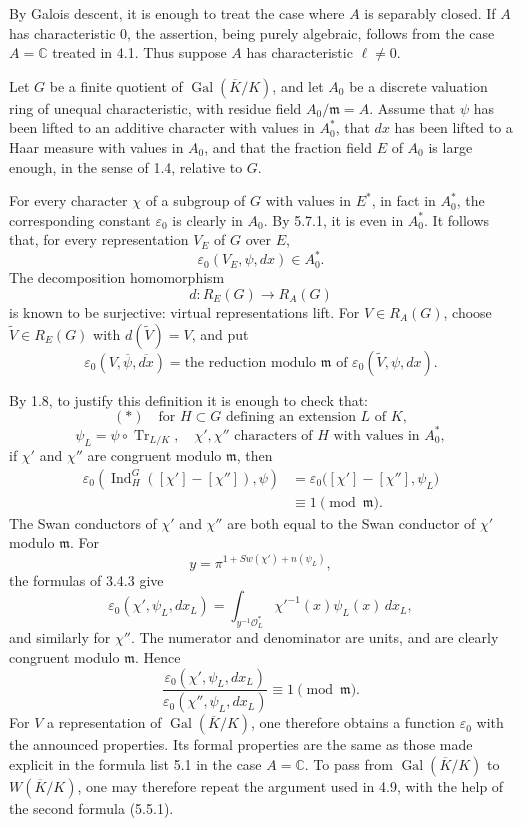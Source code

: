 \documentclass[10pt]{article}
\newcommand{\C}{\mathbb C}
\newcommand{\Gal}{\operatorname{Gal}}
\newcommand{\Ind}{\operatorname{Ind}}
\newcommand{\Tr}{\operatorname{Tr}}
\providecommand{\Gal}{\operatorname{Gal}}
\providecommand{\Gal}{\operatorname{Gal}}
\providecommand{\Tr}{\operatorname{Tr}}
\providecommand{\Gal}{\operatorname{Gal}}
\providecommand{\Tr}{\operatorname{Tr}}
\providecommand{\Gal}{\operatorname{Gal}}
\providecommand{\Tr}{\operatorname{Tr}}
\providecommand{\Ind}{\operatorname{Ind}}
\begin{document}
By Galois descent, it is enough to treat the case where \(A\) is separably closed. If \(A\) has characteristic \(0\), the assertion, being purely algebraic, follows from the case \(A=\C\) treated in 4.1. Thus suppose \(A\) has characteristic \(\ell\ne0\).

Let \(G\) be a finite quotient of \(\Gal(\overline K/K)\), and let \(A_0\) be a discrete valuation ring of unequal characteristic, with residue field \(A_0/\mathfrak m=A\). Assume that \(\psi\) has been lifted to an additive character with values in \(A_0^*\), that \(dx\) has been lifted to a Haar measure with values in \(A_0\), and that the fraction field \(E\) of \(A_0\) is large enough, in the sense of 1.4, relative to \(G\).

For every character \(\chi\) of a subgroup of \(G\) with values in \(E^*\), in fact in \(A_0^*\), the corresponding constant \(\varepsilon_0\) is clearly in \(A_0\). By 5.7.1, it is even in \(A_0^*\). It follows that, for every representation \(V_E\) of \(G\) over \(E\),
\[
\varepsilon_0(V_E,\psi,dx)\in A_0^*.
\]
The decomposition homomorphism
\[
d:R_E(G)\longrightarrow R_A(G)
\]
is known to be surjective: virtual representations lift. For \(V\in R_A(G)\), choose \(\widetilde V\in R_E(G)\) with \(d(\widetilde V)=V\), and put
\[
\varepsilon_0(V,\overline\psi,\overline{dx})
=
\text{the reduction modulo }\mathfrak m\text{ of }
\varepsilon_0(\widetilde V,\psi,dx).
\]

By 1.8, to justify this definition it is enough to check that:
\[
(*)\quad
\text{for }H\subset G\text{ defining an extension }L\text{ of }K,
\]
\[
\psi_L=\psi\circ\Tr_{L/K},\quad
\chi',\chi''\text{ characters of }H\text{ with values in }A_0^*,
\]
if \(\chi'\) and \(\chi''\) are congruent modulo \(\mathfrak m\), then
\[
\begin{aligned}
\varepsilon_0\!\left(\Ind_H^G([\chi']-[\chi'']),\psi\right)
&=\varepsilon_0\bigl([\chi']-[\chi''],\psi_L\bigr)\\
&\equiv1\pmod{\mathfrak m}.
\end{aligned}
\]
The Swan conductors of \(\chi'\) and \(\chi''\) are both equal to the Swan conductor of \(\chi'\) modulo \(\mathfrak m\). For
\[
y=\pi^{1+Sw(\chi')+n(\psi_L)},
\]
the formulas of 3.4.3 give
\[
\varepsilon_0(\chi',\psi_L,dx_L)=
\int_{y^{-1}\mathcal O_L^*}\chi'^{-1}(x)\psi_L(x)\,dx_L,
\]
and similarly for \(\chi''\). The numerator and denominator are units, and are clearly congruent modulo \(\mathfrak m\). Hence
\[
\frac{\varepsilon_0(\chi',\psi_L,dx_L)}
{\varepsilon_0(\chi'',\psi_L,dx_L)}
\equiv1\pmod{\mathfrak m}.
\]
For \(V\) a representation of \(\Gal(\overline K/K)\), one therefore obtains a function \(\varepsilon_0\) with the announced properties. Its formal properties are the same as those made explicit in the formula list 5.1 in the case \(A=\C\). To pass from \(\Gal(\overline K/K)\) to \(W(\overline K/K)\), one may therefore repeat the argument used in 4.9, with the help of the second formula (5.5.1).
\end{document}

